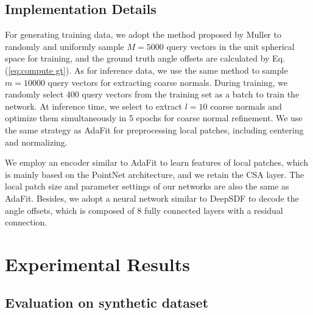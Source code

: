 \documentclass[letterpaper]{article} \usepackage{aaai23}  \usepackage{times}  \usepackage{helvet}  \usepackage{courier}  \usepackage[hyphens]{url}  \usepackage{graphicx} \urlstyle{rm} \def\UrlFont{\rm}  \usepackage{natbib}  \usepackage{caption} \frenchspacing  \setlength{\pdfpagewidth}{8.5in} \setlength{\pdfpageheight}{11in} \usepackage{algorithm}
\begin{document}
\subsection{Implementation Details}
For generating training data, we adopt the method proposed by Muller  to randomly and uniformly sample $M=5000$ query vectors in the unit spherical space for training, and the ground truth angle offsets are calculated by Eq. (\ref{eq:compute gt}). As for inference data, we use the same method to sample $m=10000$ query vectors for extracting coarse normals. During training, we randomly select 400 query vectors from the training set as a batch to train the network. At inference time, we select to extract $l=10$ coarse normals and optimize them simultaneously in 5 epochs for coarse normal refinement. We use the same strategy as AdaFit \cite{RunsongZhu2021AdaFitRL} for preprocessing local patches, including centering and normalizing.

We employ an encoder similar to AdaFit to learn features of local patches, which is mainly based on the PointNet  \cite{CharlesRQi2016PointNetDL} architecture, and we retain the CSA layer. The local patch size and parameter settings of our networks are also the same as AdaFit. Besides, we adopt a neural network similar to DeepSDF \cite{JeongJoonPark2019DeepSDFLC} to decode the angle offsets, which is composed of 8 fully connected layers with a residual connection.

\section{Experimental Results}

\subsection{Evaluation on synthetic dataset}
\end{document}
